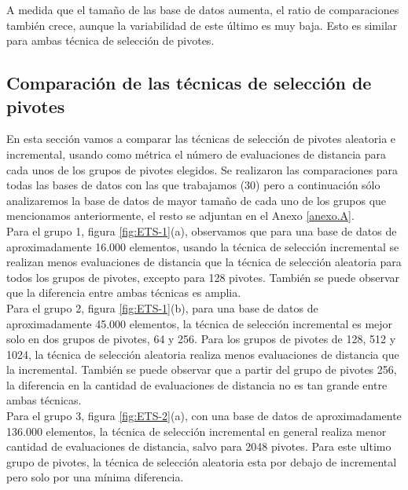 A medida que el tama\~no de las base de datos aumenta, el ratio de comparaciones tambi\'en crece, aunque la variabilidad de este \'ultimo es muy baja. Esto es similar para ambas t\'ecnica de selecci\'on de pivotes.

\subsection{Comparaci\'on de las t\'ecnicas de selecci\'on de pivotes}

En esta secci\'on vamos a comparar las t\'ecnicas de selecci\'on de pivotes aleatoria e incremental, usando como m\'etrica el n\'umero de evaluaciones de distancia para cada unos de los grupos de pivotes elegidos. Se realizaron las comparaciones para todas las bases de datos con las que trabajamos (30) pero a continuaci\'on s\'olo analizaremos la base de datos de mayor tama\~no de cada uno de los grupos que mencionamos anteriormente, el resto se adjuntan en el Anexo \ref{anexo.A}.\\

Para el grupo 1, figura \ref{fig:ETS-1}(a), observamos que para una base de datos de aproximadamente 16.000 elementos, usando la t\'ecnica de selecci\'on incremental se realizan menos evaluaciones de distancia que la t\'ecnica de selecci\'on aleatoria para todos los grupos de pivotes, excepto para 128 pivotes. Tambi\'en se puede observar que la diferencia entre ambas t\'ecnicas es amplia.\\

Para el grupo 2, figura \ref{fig:ETS-1}(b), para una base de datos de aproximadamente 45.000 elementos, la t\'ecnica de selecci\'on incremental es mejor solo en dos grupos de pivotes, 64 y 256. Para los grupos de pivotes de 128, 512 y 1024, la t\'ecnica de selecci\'on aleatoria realiza menos evaluaciones de distancia que la incremental. Tambi\'en se puede observar que a partir del grupo de pivotes 256, la diferencia en la cantidad de evaluaciones de distancia no es tan grande entre ambas t\'ecnicas.\\

Para el grupo 3, figura \ref{fig:ETS-2}(a), con una base de datos de aproximadamente 136.000 elementos, la t\'ecnica de selecci\'on incremental en general realiza menor cantidad de evaluaciones de distancia, salvo para 2048 pivotes. Para este ultimo grupo de pivotes, la t\'ecnica de selecci\'on aleatoria esta por debajo de incremental pero solo por una m\'inima diferencia.\\

